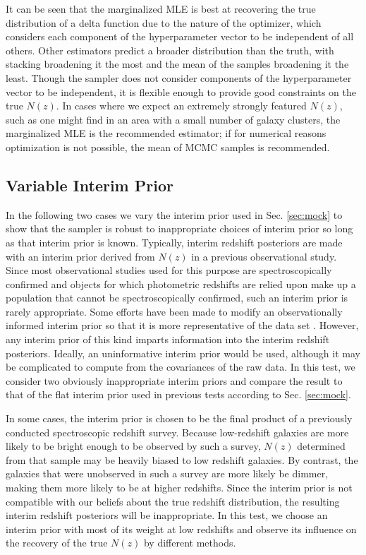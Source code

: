 \documentclass[preprint]{aastex}
\begin{document}
It can be seen that the marginalized MLE is best at recovering the true 
distribution of a delta function due to the nature of the optimizer, which 
considers each component of the hyperparameter vector to be independent of all 
others.  Other estimators predict a broader distribution than the truth, with 
stacking broadening it the most and the mean of the samples broadening it the 
least.  Though the sampler does not consider components of the hyperparameter 
vector to be independent, it is flexible enough to provide good constraints on 
the true $N(z)$.  In cases where we expect an extremely strongly featured 
$N(z)$, such as one might find in an area with a small number of galaxy 
clusters, the marginalized MLE is the recommended estimator; if for numerical 
reasons optimization is not possible, the mean of MCMC samples is recommended.

\subsection{Variable Interim Prior}
\label{sec:interim}

In the following two cases we vary the interim prior used in Sec. 
\ref{sec:mock} to show that the sampler is robust to inappropriate choices of 
interim prior so long as that interim prior is known.  Typically, interim 
redshift posteriors are made with an interim prior derived from $N(z)$ in a 
previous observational study.  Since most observational studies used for this 
purpose are spectroscopically confirmed and objects for which photometric 
redshifts are relied upon make up a population that cannot be spectroscopically 
confirmed, such an interim prior is rarely appropriate.  Some efforts have been 
made to modify an observationally informed interim prior so that it is more 
representative of the data set \citep{Sheldon2012}.  However, any interim prior 
of this kind imparts information into the interim redshift posteriors.  
Ideally, an uninformative interim prior would be used, although it may be 
complicated to compute from the covariances of the raw data.  In this test, we 
consider two obviously inappropriate interim priors and compare the result to 
that of the flat interim prior used in previous tests according to Sec. 
\ref{sec:mock}.

In some cases, the interim prior is chosen to be the final product of a 
previously conducted spectroscopic redshift survey.  Because low-redshift 
galaxies are more likely to be bright enough to be observed by such a survey, 
$N(z)$ determined from that sample may be heavily biased to low redshift 
galaxies.  By contrast, the galaxies that were unobserved in such a survey are 
more likely be dimmer, making them more likely to be at higher redshifts.  
Since the interim prior is not compatible with our beliefs about the true 
redshift distribution, the resulting interim redshift posteriors will be 
inappropriate.  In this test, we choose an interim prior with most of its 
weight at low redshifts and observe its influence on the recovery of the true 
$N(z)$ by different methods.  
\end{document}
